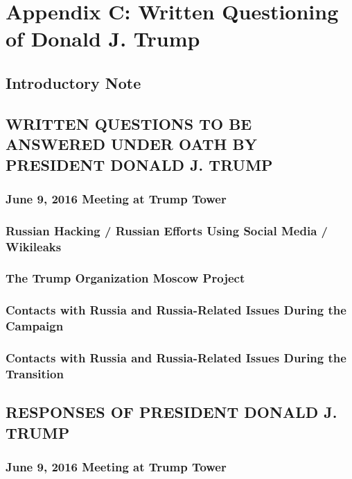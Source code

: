 \section{Appendix C: Written Questioning of Donald J. Trump}

\subsection{Introductory Note}

\subsection{WRITTEN QUESTIONS TO BE ANSWERED UNDER OATH BY PRESIDENT DONALD J. TRUMP}

\subsubsection{June 9, 2016 Meeting at Trump Tower}

\subsubsection{Russian Hacking / Russian Efforts Using Social Media / Wikileaks}

\subsubsection{The Trump Organization Moscow Project}

\subsubsection{Contacts with Russia and Russia-Related Issues During the Campaign}

\subsubsection{Contacts with Russia and Russia-Related Issues During the Transition}

\subsection{RESPONSES OF PRESIDENT DONALD J. TRUMP}

\subsubsection{June 9, 2016 Meeting at Trump Tower}

